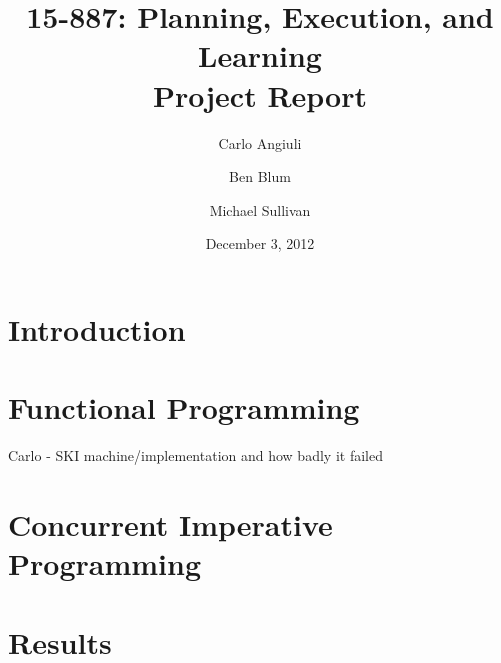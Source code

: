 \documentclass{article}
\title{
{\large 15-887: Planning, Execution, and Learning}\\
Project Report}
\author{Carlo Angiuli \and Ben Blum \and Michael Sullivan}
\date{December 3, 2012}
\begin{document}
\maketitle

\section{Introduction}

\section{Functional Programming}

Carlo - SKI machine/implementation and how badly it failed

\section{Concurrent Imperative Programming}

\section{Results}
\end{document}
